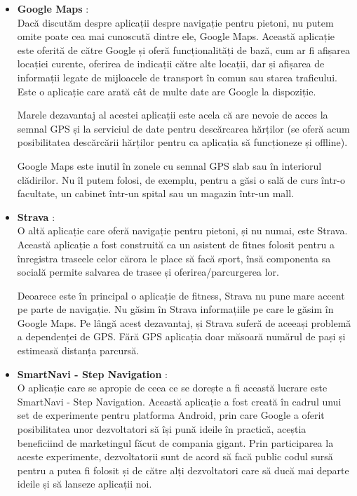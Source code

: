 \documentclass[12pt,a4paper]{article}
\begin{document}
\begin{itemize}  
\item \textbf{Google Maps} \cite{GoogleMaps}:\\
Dacă discutăm despre aplicații despre navigație pentru pietoni, nu putem omite poate cea mai cunoscută dintre ele, Google Maps. Această aplicație este oferită de către Google și oferă funcționalități de bază, cum ar fi afișarea locației curente, oferirea de indicații către alte locații, dar și afișarea de informații legate de mijloacele de transport în comun sau starea traficului. Este o aplicație care arată cât de multe date are Google la dispoziție. 

Marele dezavantaj al acestei aplicații este acela că are nevoie de acces la semnal GPS și la serviciul de date pentru descărcarea hărților (se oferă acum posibilitatea descărcării hărților pentru ca aplicația să funcționeze și offline).
 
Google Maps este inutil în zonele cu semnal GPS slab sau în interiorul clădirilor. Nu îl putem folosi, de exemplu, pentru a găsi o sală de curs într-o facultate, un cabinet într-un spital sau un magazin într-un mall. 
 
\item \textbf{Strava} \cite{Strava}:\\
O altă aplicație care oferă navigație pentru pietoni, și nu numai, este Strava. Această aplicație a fost construită ca un asistent de fitnes folosit pentru a înregistra traseele celor cărora le place să facă sport, însă componenta sa socială permite salvarea de trasee și oferirea/parcurgerea lor.

Deoarece este în principal o aplicație de fitness, Strava nu pune mare accent pe parte de navigație. Nu găsim în Strava informațiile pe care le găsim în Google Maps. Pe lângă acest dezavantaj, și Strava suferă de aceeași problemă a dependenței de GPS. Fără GPS aplicația doar măsoară numărul de pași și estimeasă distanța parcursă.

\item \textbf{SmartNavi - Step Navigation} \cite{SmartNavi}:\\
O aplicație care se apropie de ceea ce se dorește a fi această lucrare este SmartNavi - Step Navigation. Această aplicație a fost creată în cadrul unui set de experimente pentru platforma Android, prin care Google a oferit posibilitatea unor dezvoltatori să își pună ideile în practică, aceștia beneficiind de marketingul făcut de compania gigant. Prin participarea la aceste experimente, dezvoltatorii sunt de acord să facă public codul sursă pentru a putea fi folosit și de către alți dezvoltatori care să ducă mai departe ideile și să lanseze aplicații noi.


\end{itemize}
\end{document}
